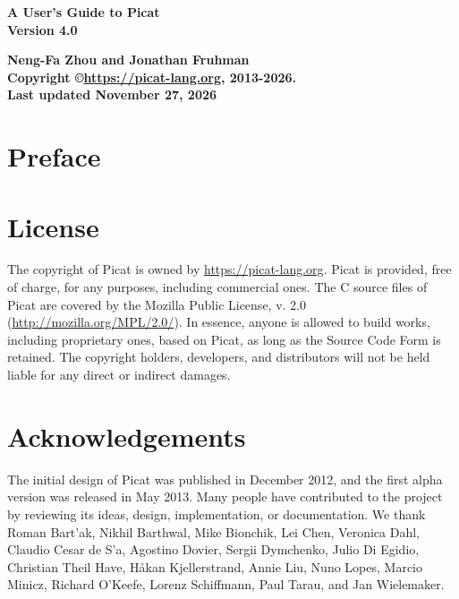 \documentclass[11pt]{report}
\begin{document}
\vspace*{4cm}
\begin{center}
{\Huge\bf A User's Guide to Picat} \\
{\large\bf Version 4.0} \\


\vspace*{1cm}

{\large\bf Neng-Fa Zhou and Jonathan Fruhman} \\
\vspace*{1cm}
{\bf Copyright \copyright \url{https://picat-lang.org}, 2013-2026.} \\
{\bf Last updated November 27, 2026} \\
\end{center}
\thispagestyle{empty}
\clearpage

\pagestyle{plain}

\section*{Preface}


\clearpage
\section*{License}
The copyright of Picat is owned by \url{https://picat-lang.org}. Picat is provided, free of charge, for any purposes, including commercial ones. The C source files of Picat are covered by the Mozilla Public License, v. 2.0 (\url{http://mozilla.org/MPL/2.0/}). In essence, anyone is allowed to build works, including proprietary ones, based on Picat, as long as the Source Code Form is retained. The copyright holders, developers, and distributors will not be held liable for any direct or indirect damages.

 
\section*{Acknowledgements}
The initial design of Picat was published in December 2012, and the first alpha version was released in May 2013. Many people have contributed to the project by reviewing its ideas, design, implementation, or documentation. We thank Roman Bart'{a}k, Nikhil Barthwal, Mike Bionchik, Lei Chen, Veronica Dahl, Claudio Cesar de S'{a}, Agostino Dovier, Sergii Dymchenko, Julio Di Egidio, Christian Theil Have, H{\aa}kan Kjellerstrand, Annie Liu, Nuno Lopes, Marcio Minicz, Richard O'Keefe, Lorenz Schiffmann, Paul Tarau, and Jan Wielemaker.
\end{document}
